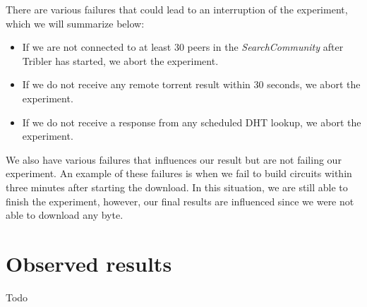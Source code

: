 There are various failures that could lead to an interruption of the experiment, which we will summarize below:
\begin{itemize}
	\item If we are not connected to at least 30 peers in the \emph{SearchCommunity} after Tribler has started, we abort the experiment.
	\item If we do not receive any remote torrent result within 30 seconds, we abort the experiment.
	\item If we do not receive a response from any scheduled DHT lookup, we abort the experiment.
\end{itemize}
We also have various failures that influences our result but are not failing our experiment. An example of these failures is when we fail to build circuits within three minutes after starting the download. In this situation, we are still able to finish the experiment, however, our final results are influenced since we were not able to download any byte.

\section{Observed results}
Todo